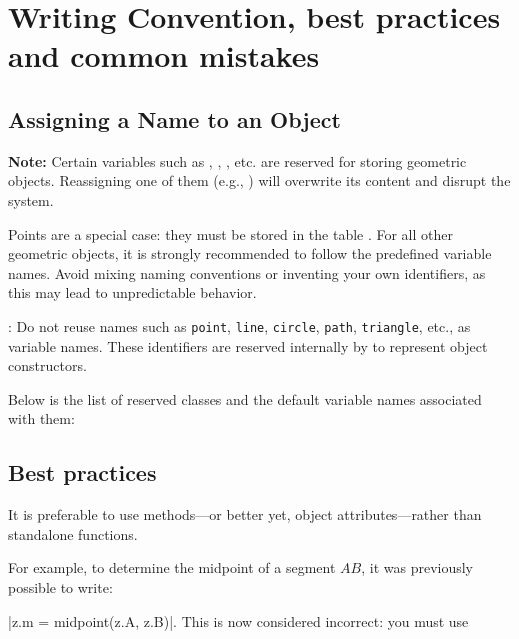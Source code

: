 \newpage

\section{Writing Convention, best practices and common mistakes}
\subsection{Assigning a Name to an Object}

\textbf{Note:} Certain variables such as , , , etc. are reserved for storing geometric objects.
Reassigning one of them (e.g., ) will overwrite its content and disrupt the system.

Points are a special case: they must be stored in the table .
For all other geometric objects, it is strongly recommended to follow the predefined variable names.
Avoid mixing naming conventions or inventing your own identifiers, as this may lead to unpredictable behavior.

\vspace{1em}
\tkzRHand{\textcolor{red}{Warning}}: Do not reuse names such as \texttt{point}, \texttt{line}, \texttt{circle}, \texttt{path}, \texttt{triangle}, etc., as variable names.
These identifiers are reserved internally by  to represent object constructors.

\vspace{1em}
Below is the list of reserved classes and the default variable names associated with them:
\label{list of reserved classes}

\vspace{1em}
\textcolor{red}{ }

\subsection{Best practices}

It is preferable to use methods—or better yet, object attributes—rather than standalone functions.

For example, to determine the midpoint of a segment $AB$, it was previously possible to write:

|z.m = midpoint(z.A, z.B)|.  This is now considered incorrect: you must use

